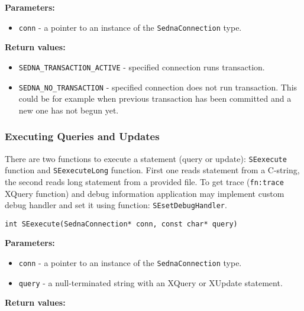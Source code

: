 \documentclass[a4paper,12pt]{article}
\newenvironment{citemize}
{\begin{itemize}
  \setlength{\itemsep}{0pt}
  \setlength{\parskip}{0pt}
  \setlength{\parsep}{0pt}}
{\end{itemize}}
\begin{document}
\noindent
\textbf{Parameters:}

\begin{citemize}
\item\verb!conn! - a pointer to an instance of the \verb!SednaConnection! type.
\end{citemize}

\noindent
\textbf{Return values:}

\begin{citemize}
\item\verb!SEDNA_TRANSACTION_ACTIVE! - specified connection runs transaction.
\item\verb!SEDNA_NO_TRANSACTION! - specified connection does not run
transaction. This could be for example when previous transaction has been
committed and a new one has not begun yet.
\end{citemize}


\subsubsection{Executing Queries and Updates}
\label{exec-capi}

There are two functions to execute a statement (query or update):
\verb!SEexecute! function and \verb!SEexecuteLong! function. First one reads
statement from a C-string, the second reads long statement from a provided file.
To get trace (\verb!fn:trace! XQuery function) and debug information application
may implement custom debug handler and set it using function:
\verb!SEsetDebugHandler!.

\begin{verbatim}
int SEexecute(SednaConnection* conn, const char* query)
\end{verbatim}

\noindent
\textbf{Parameters:}

\begin{citemize}
\item\verb!conn! - a pointer to an instance of the \verb!SednaConnection! type.
\item\verb!query! - a null-terminated string with an XQuery or XUpdate
statement.
\end{citemize}

\noindent
\textbf{Return values:}

\medskip
\end{document}
